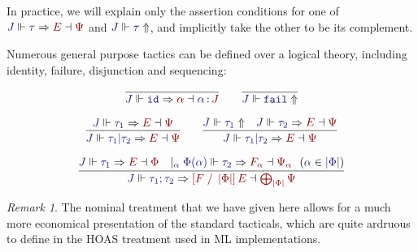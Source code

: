 \documentclass[11pt]{amsart}
\theoremstyle{definition}
\theoremstyle{remark}
\newtheorem{remark}[thm]{Remark}
\numberwithin{equation}{section}
\def\InputModeColorName{MidnightBlue}
\def\OutputModeColorName{Maroon}
\newcommand\InputMode[1]{{\color{\InputModeColorName}{#1}}}
\newcommand\OutputMode[1]{{\color{\OutputModeColorName}{#1}}}
\newcommand\HypJ[2]{#1\ \ (#2)}
\newcommand\GenJ[2]{\vert_{\InputMode{#1}}\; #2}
\newcommand\JJ{J}
\newcommand\SG[2]{\InputMode{#1}\,{\color{Black}:}\,\OutputMode{#2}}
\newcommand\Refine[4]{\InputMode{#1}\Vdash\InputMode{#2}\Rightarrow\OutputMode{#4}\dashv\OutputMode{#3}}
\newcommand\NoRefine[2]{\InputMode{#1}\Vdash\InputMode{#2}\Uparrow}
\newcommand\Member[2]{\InputMode{#1}\in\InputMode{#2}}
\newcommand\IdTac{\mathtt{id}}
\newcommand\FailTac{\mathtt{fail}}
\newcommand\OrElseTac[2]{#1\vert#2}
\newcommand\ThenTac[2]{#1;#2}
\newcommand\Dom[1]{\left\vert#1\right\vert}
\newcommand\Subst[3]{\left[#1\;/\;#2\right]#3}
\begin{document}
In practice, we will explain only the assertion conditions for one of
$\Refine{\JJ}{\tau}{\Psi}{E}$ and $\NoRefine{\JJ}{\tau}$, and implicitly take
the other to be its complement.

Numerous general purpose tactics can be defined over a logical theory,
including identity, failure, disjunction and sequencing:

\begin{gather*}
  \infer{
    \Refine{\JJ}{\IdTac}{\SG{\alpha}{\JJ}}{\alpha}
  }{
  }
  \qquad
  \infer{
    \NoRefine{\JJ}{\FailTac}
  }{
  }\\[6pt]
  \infer{
    \Refine{\JJ}{\OrElseTac{\tau_1}{\tau_2}}{\Psi}{E}
  }{
    \Refine{\JJ}{\tau_1}{\Psi}{E}
  }
  \qquad
  \infer{
    \Refine{\JJ}{\OrElseTac{\tau_1}{\tau_2}}{\Psi}{E}
  }{
    \NoRefine{\JJ}{\tau_1} &
    \Refine{\JJ}{\tau_2}{\Psi}{E}
  }\\[6pt]
  \infer{
    \Refine{\JJ}{\ThenTac{\tau_1}{\tau_2}}{\bigoplus_{\Dom\Phi}\Psi}{\Subst{F}{\Dom\Phi}{E}}
  }{
    \Refine{\JJ}{\tau_1}{\Phi}{E} &
    \GenJ{\alpha}{
      \HypJ{
        \Refine{\Phi(\alpha)}{\tau_2}{\Psi_\alpha}{F_\alpha}
      }{
        \Member{\alpha}{\Dom\Phi}
      }
    }
  }
\end{gather*}

\begin{remark}
  The nominal treatment that we have given here allows for a much more
  economical presentation of the standard tacticals, which are quite ardruous
  to define in the HOAS treatment used in ML implementations.
\end{remark}
\end{document}
